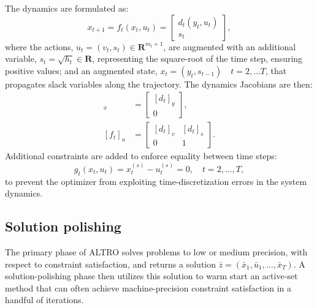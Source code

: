 The dynamics are formulated as: 
\begin{equation}
	x_{t+1} = f_t(x_t, u_t) = \begin{bmatrix} d_t(y_t, u_t) \\ s_t \end{bmatrix} \label{altro_free_time_dynamics},
\end{equation}
where the actions, $u_t = (v_t, s_t) \in \mathbf{R}^{m_t + 1}$, are augmented with an additional variable, $s_t = \sqrt{h_t} \in \mathbf{R}$, representing the square-root of the time step, ensuring positive values; and an augmented state, $x_t = (y_t, s_{t-1}) \quad t = 2, \dots T$, that propagates slack variables along the trajectory. The dynamics Jacobians are then:
\begin{align}
	[f_t]_x &= \begin{bmatrix} [d_t]_y \\ 0 \end{bmatrix}, \\
	[f_t]_u &= \begin{bmatrix} [d_t]_v & [d_t]_s \\ 0 & 1 \end{bmatrix}.
\end{align}
Additional constraints are added to enforce equality between time steps:
\begin{equation}
	g_t(x_t, u_t) = x_t^{(s)} - u_t^{(s)} = 0, \quad t = 2, \dots, T,
\end{equation}
to prevent the optimizer from exploiting time-discretization errors in the system dynamics.

\subsection{Solution polishing} \label{altro_projected_newton}
The primary phase of ALTRO solves problems to low or medium precision, with respect to constraint satisfaction, and returns a solution $\bar{z} = (\bar{x}_1, \bar{u}_1, \dots, \bar{x}_T)$. A solution-polishing phase then utilizes this solution to warm start an active-set method \cite{nocedal2006numerical} that can often achieve machine-precision constraint satisfaction in a handful of iterations.

